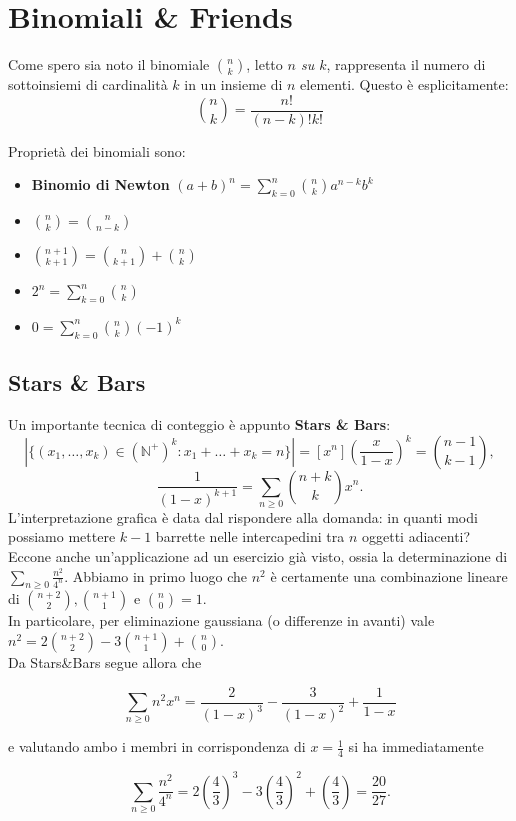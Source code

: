 \documentclass[a4paper,twoside]{article}
\newcommand{\N}{\mathbb{N}}
\theoremstyle{definition}
\numberwithin{theorem}{section}
\begin{document}
\newpage

\section{Binomiali \& Friends}
Come spero sia noto il binomiale $\binom{n}{k}$, letto \emph{$n$ su $k$}, rappresenta il numero di sottoinsiemi di cardinalità $k$ in un insieme di $n$ elementi.
Questo è esplicitamente:\\
$$\binom{n}{k} = \frac{n!}{(n-k)!k!}$$    

Proprietà dei binomiali sono: 
\begin{itemize}
    \item \textbf{Binomio di Newton} $(a+b)^n=\sum_{k=0}^{n}\binom{n}{k}a^{n-k}b^k$
    \item $\binom{n}{k}=\binom{n}{n-k}$
    \item $\binom{n+1}{k+1}=\binom{n}{k+1} + \binom{n}{k}$
    \item $2^n= \sum_{k=0}^{n}\binom{n}{k}$
    \item $0 = \sum_{k=0}^{n}\binom{n}{k}(-1)^k$
\end{itemize}

\subsection{Stars \& Bars}
Un importante tecnica di conteggio è appunto \textbf{Stars \& Bars}:
$$\left|\{(x_1,\ldots,x_k)\in(\N^+)^k: x_1+\ldots+x_k = n\}\right|=[x^n]\left(\frac{x}{1-x}\right)^k = \binom{n-1}{k-1},$$
$$ \frac{1}{(1-x)^{k+1}}=\sum_{n\geq 0}\binom{n+k}{k}x^n. $$
L'interpretazione grafica è data dal rispondere alla domanda: in quanti modi possiamo mettere $k-1$ barrette nelle intercapedini tra $n$ oggetti adiacenti? Eccone anche un'applicazione ad un esercizio già visto, ossia la determinazione di $\sum_{n\geq 0}\frac{n^2}{4^n}$. Abbiamo in primo luogo che $n^2$ è certamente una combinazione lineare di $\binom{n+2}{2},\binom{n+1}{1}$ e $\binom{n}{0}=1$.\\ In particolare, per eliminazione gaussiana (o differenze in avanti) vale $n^2=2\binom{n+2}{2}-3\binom{n+1}{1}+\binom{n}{0}$.\\ Da Stars\&Bars segue allora che 

$$ \sum_{n\geq 0} n^2 x^n = \frac{2}{(1-x)^3}-\frac{3}{(1-x)^2}+\frac{1}{1-x} $$

e valutando ambo i membri in corrispondenza di $x=\frac{1}{4}$ si ha immediatamente 

$$ \sum_{n\geq 0}\frac{n^2}{4^n} = 2\left(\frac{4}{3}\right)^3-3\left(\frac{4}{3}\right)^2+\left(\frac{4}{3}\right)=\frac{20}{27}.$$
\end{document}
